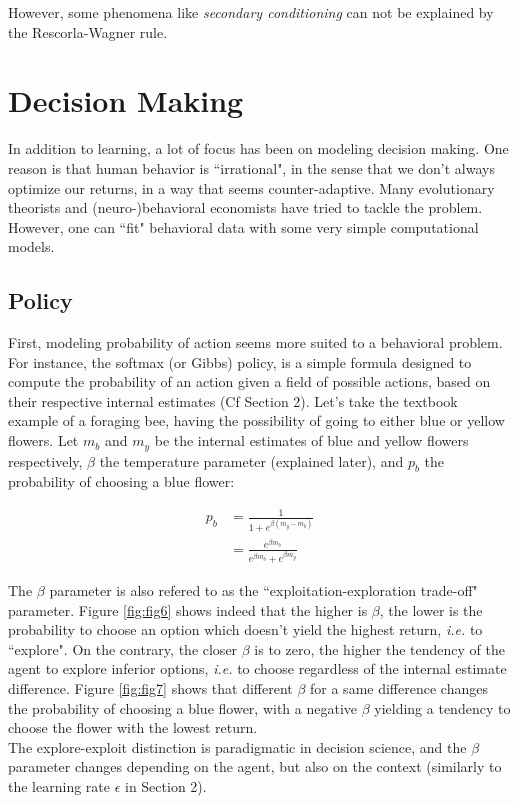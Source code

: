 \documentclass{article}
\begin{document}
However, some phenomena like \textit{secondary conditioning} can not be explained by the Rescorla-Wagner rule.
 \section{Decision Making}
\indent\indent In addition to learning, a lot of focus has been on modeling decision making. One reason is that human behavior is ``irrational", in the sense that we don't always optimize our returns, in a way that seems counter-adaptive. Many evolutionary theorists and (neuro-)behavioral economists have tried to tackle the problem. However, one can ``fit" behavioral data with some very simple computational models.\\

 \subsection{Policy}

\indent\indent First, modeling probability of action seems more suited to a behavioral problem. For instance, the softmax (or Gibbs) policy, is a simple formula designed to compute the probability of an action given a field of possible actions, based on their respective internal estimates (Cf Section 2). Let's take the textbook example of a foraging bee, having the possibility of going to either blue or yellow flowers. Let $m_b$ and $m_y$ be the internal estimates of blue and yellow flowers respectively, $\beta$ the temperature parameter (explained later), and $p_b$ the probability of choosing a blue flower:

\begin{align*}
  p_b &=   \frac{1} {1 + e^{\beta (m_y - m_b)}} \\
      &= \frac{e^{\beta m_b}} {e^{\beta m_b} + e^{\beta m_y}}
\end{align*}

The $\beta$ parameter is also refered to as the ``exploitation-exploration trade-off" parameter. Figure \ref{fig:fig6} shows indeed that the higher is $\beta$, the lower is the probability to choose an option which doesn't yield the highest return, \textit{i.e.} to ``explore". On the contrary, the closer $\beta$ is to zero, the higher the tendency of the agent to explore inferior options, \textit{i.e.} to choose regardless of the internal estimate difference. Figure \ref{fig:fig7} shows that different $\beta$ for a same difference changes the probability of choosing a blue flower, with a negative $\beta$ yielding a tendency to choose the flower with the lowest return.
\\
 The explore-exploit distinction is paradigmatic in decision science, and the $\beta$ parameter changes depending on the agent, but also on the context (similarly to the learning rate $\epsilon$ in Section 2).
\end{document}
